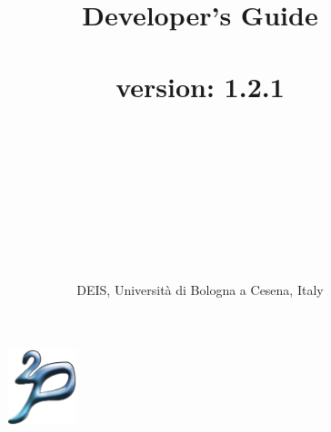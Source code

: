 \documentclass[11pt]{report}
\title{{\huge{\bf{\tuprolog{} Developer's Guide\\\mbox{ }\\}}}
        \tuprolog{} version: 1.2.1\\\mbox{ }\\
{\small{
    \version{001}\\
    \creationdate{2002-09-17}\\
    \lastchangesdate{2004-03-19}\\
    }}
}
\author{ \mbox{ }\\DEIS, Universit\`{a} di Bologna a Cesena, Italy
}
\date{}
\newcommand\logo{
    \begin{figure}[tp]
        \begin{center}
            \includegraphics[width=2cm]{images/logo}
        \end{center}
\end{figure}
}
\begin{document}
\logo

\maketitle

\tableofcontents


%



%


\end{document}
